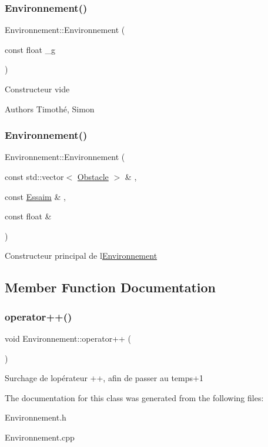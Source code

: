 \subsubsection{\texorpdfstring{Environnement()}{Environnement()}\hspace{0.1cm}{\footnotesize\ttfamily [1/2]}}
{\footnotesize\ttfamily Environnement\+::\+Environnement (\begin{DoxyParamCaption}\item[{const float}]{\+\_\+g }\end{DoxyParamCaption})}

Constructeur vide

\begin{DoxyAuthor}{Authors}
Timothé, Simon 
\end{DoxyAuthor}
\mbox{\label{class_environnement_a63bc7f1c4687029018c3a1ac452fab4b}} 
\subsubsection{\texorpdfstring{Environnement()}{Environnement()}\hspace{0.1cm}{\footnotesize\ttfamily [2/2]}}
{\footnotesize\ttfamily Environnement\+::\+Environnement (\begin{DoxyParamCaption}\item[{const std\+::vector$<$ \mbox{\hyperlink{class_obstacle}{Obstacle}} $>$ \&}]{,  }\item[{const \mbox{\hyperlink{class_essaim}{Essaim}} \&}]{,  }\item[{const float \&}]{ }\end{DoxyParamCaption})}

Constructeur principal de l\textquotesingle{}\mbox{\hyperlink{class_environnement}{Environnement}} 

\subsection{Member Function Documentation}
\mbox{\label{class_environnement_a9f855742c6fb69335f0852a018d321f4}} 
\subsubsection{\texorpdfstring{operator++()}{operator++()}}
{\footnotesize\ttfamily void Environnement\+::operator++ (\begin{DoxyParamCaption}{ }\end{DoxyParamCaption})}

Surchage de l\textquotesingle{}opérateur ++, afin de passer au temps+1 

The documentation for this class was generated from the following files\+:\begin{DoxyCompactItemize}
\item 
Environnement.\+h\item 
Environnement.\+cpp\end{DoxyCompactItemize}
